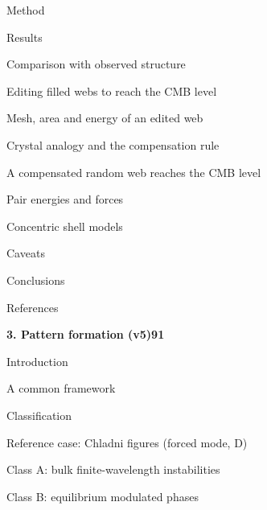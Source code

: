 \documentclass[11pt,a4paper]{article}
\begin{document}
{\noindent\hspace*{1.2em}Method\par
\noindent\hspace*{1.2em}Results\par
\noindent\hspace*{1.2em}Comparison with observed structure\par
\noindent\hspace*{1.2em}Editing filled webs to reach the CMB level\par
\noindent\hspace*{1.2em}Mesh, area and energy of an edited web\par
\noindent\hspace*{1.2em}Crystal analogy and the compensation rule\par
\noindent\hspace*{1.2em}A compensated random web reaches the CMB level\par
\noindent\hspace*{1.2em}Pair energies and forces\par
\noindent\hspace*{1.2em}Concentric shell models\par
\noindent\hspace*{1.2em}Caveats\par
\noindent\hspace*{1.2em}Conclusions\par
\noindent\hspace*{1.2em}References\par
\noindent\textbf{3. Pattern formation (v5)}\dotfill\textbf{91}\par\smallskip
\noindent\hspace*{1.2em}Introduction\par
\noindent\hspace*{1.2em}A common framework\par
\noindent\hspace*{1.2em}Classification\par
\noindent\hspace*{1.2em}Reference case: Chladni figures (forced mode, D)\par
\noindent\hspace*{1.2em}Class A: bulk finite-wavelength instabilities\par
\noindent\hspace*{1.2em}Class B: equilibrium modulated phases\par
}
\end{document}
